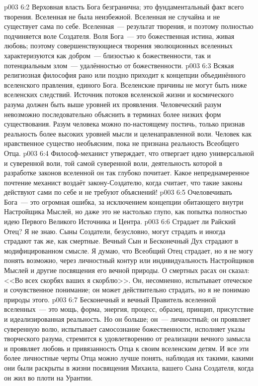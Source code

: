 \vs p003 6:2 Верховная власть Бога безгранична; это фундаментальный факт всего творения. Вселенная не была неизбежной. Вселенная не случайна и не существует сама по себе. Вселенная~--- результат творения, и поэтому полностью подчиняется воле Создателя. Воля Бога~--- это божественная истина, живая любовь; поэтому совершенствующиеся творения эволюционных вселенных характеризуются как добром~--- близостью к божественности, так и потенциальным злом~--- удалённостью от божественности.
\vs p003 6:3 \pc Всякая религиозная философия рано или поздно приходит к концепции объединённого вселенского правления, единого Бога. Вселенские причины не могут быть ниже вселенских следствий. Источник потоков вселенской жизни и космического разума должен быть выше уровней их проявления. Человеческий разум невозможно последовательно объяснить в терминах более низких форм существования. Разум человека можно по\hyp{}настоящему постичь, только признав реальность более высоких уровней мысли и целенаправленной воли. Человек как нравственное существо необъясним, пока не признана реальность Всеобщего Отца.
\vs p003 6:4 Философ\hyp{}механист утверждает, что отвергает идею универсальной и суверенной воли, той самой суверенной воли, деятельность которой в разработке законов вселенной он так глубоко почитает. Какое непреднамеренное почтение механист воздаёт закону\hyp{}Создателю, когда считает, что такие законы действуют сами по себе и не требуют объяснений!
\vs p003 6:5 Очеловечивать Бога~--- это огромная ошибка, за исключением концепции обитающего внутри Настройщика Мыслей, но даже это не настолько глупо, как попытка полностью  идею Первого Великого Источника и Центра.
\vs p003 6:6 \pc Страдает ли Райский Отец? Я не знаю. Сыны Создатели, безусловно, могут страдать и иногда страдают так же, как смертные. Вечный Сын и Бесконечный Дух страдают в модифицированном смысле. Я думаю, что Всеобщий Отец страдает, но я не могу понять  возможно, через личностный контур или индивидуальность Настройщиков Мыслей и другие посвящения его вечной природы. О смертных расах он сказал: <<Во всех скорбях ваших я скорблю>>. Он, несомненно, испытывает отеческое и сочувственное понимание; он может действительно страдать, но я не понимаю природы этого.
\vs p003 6:7 \pc Бесконечный и вечный Правитель вселенной вселенных~--- это мощь, форма, энергия, процесс, образец, принцип, присутствие и идеализированная реальность. Но он больше; он~--- личностный; он проявляет суверенную волю, испытывает самосознание божественности, исполняет указы творческого разума, стремится к удовлетворению от реализации вечного замысла и проявляет любовь и привязанность Отца к своим вселенским детям. И все эти более личностные черты Отца можно лучше понять, наблюдая их такими, какими они были раскрыты в жизни посвящения Михаила, вашего Сына Создателя, когда он жил во плоти на Урантии.
